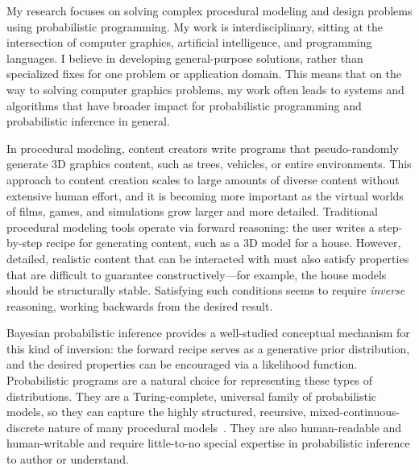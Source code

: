 \documentclass[
11pt, %
a4paper, %
oneside, %
headinclude,footinclude, %
BCOR5mm, %
]{scrartcl}
\title{\normalfont\spacedallcaps{Daniel Ritchie}} %
\author{\spacedallcaps{Research Statement}} %
\date{} %
\begin{document}

\pagestyle{scrheadings}
\clearscrheadings
\newcommand{\headertext}{\spacedlowsmallcaps{\color{black} Daniel Ritchie \color{halfgray} Research Statement}}
\ohead{\headertext}
\cfoot[\pagemark]{\pagemark}


\maketitle

My research focuses on solving complex procedural modeling and design problems using probabilistic programming. My work is interdisciplinary, sitting at the intersection of computer graphics, artificial intelligence, and programming languages. I believe in developing general-purpose solutions, rather than specialized fixes for one problem or application domain. This means that on the way to solving computer graphics problems, my work often leads to systems and algorithms that have broader impact for probabilistic programming and probabilistic inference in general.

In procedural modeling, content creators write programs that pseudo-randomly generate 3D graphics content, such as trees, vehicles, or entire environments. This approach to content creation scales to large amounts of diverse content without extensive human effort, and it is becoming more important as the virtual worlds of films, games, and simulations grow larger and more detailed. Traditional procedural modeling tools operate via forward reasoning: the user writes a step-by-step recipe for generating content, such as a 3D model for a house. However, detailed, realistic content that can be interacted with must also satisfy properties that are difficult to guarantee constructively—for example, the house models should be structurally stable. Satisfying such conditions seems to require \emph{inverse} reasoning, working backwards from the desired result.

Bayesian probabilistic inference provides a well-studied conceptual mechanism for this kind of inversion: the forward recipe serves as a generative prior distribution, and the desired properties can be encouraged via a likelihood function. Probabilistic programs are a natural choice for representing these types of distributions. They are a Turing-complete, universal family of probabilistic models, so they can capture the highly structured, recursive, mixed-continuous-discrete nature of many procedural models~\cite{Church}. They are also human-readable and human-writable and require little-to-no special expertise in probabilistic inference to author or understand.
\end{document}

